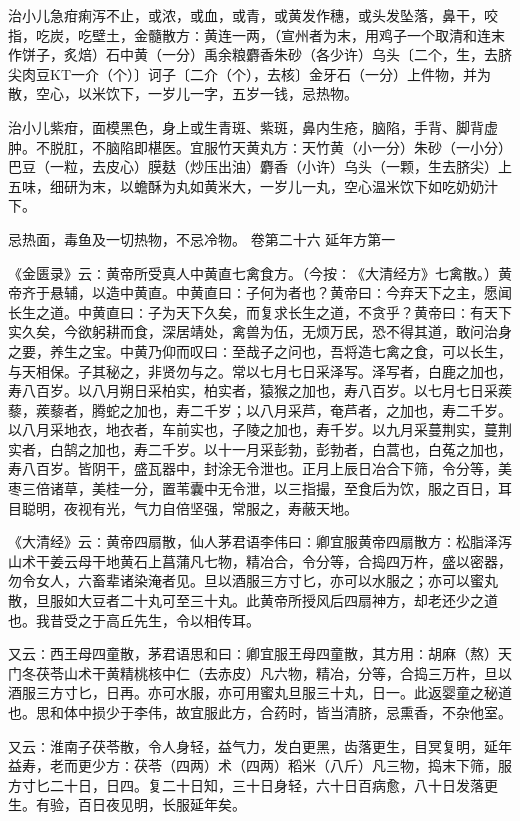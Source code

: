 \documentclass[a4paper,12pt,UTF8,twoside]{ctexbook}
\begin{document}
治小儿急疳痢泻不止，或浓，或血，或青，或黄发作穗，或头发坠落，鼻干，咬指，吃炭，吃壁土，金髓散方∶黄连一两，（宣州者为末，用鸡子一个取清和连末作饼子，炙焙）石中黄（一分）禹余粮麝香朱砂（各少许）乌头〔二个，生，去脐尖肉豆KT一介（个）〕诃子〔二介（个），去核〕金牙石（一分）上件物，并为散，空心，以米饮下，一岁儿一字，五岁一钱，忌热物。

治小儿紫疳，面模黑色，身上或生青斑、紫斑，鼻内生疮，脑陷，手背、脚背虚肿。不脱肛，不脑陷即椹医。宜服竹天黄丸方∶天竹黄（小一分）朱砂（一小分）巴豆（一粒，去皮心）膜麸（炒压出油）麝香（小许）乌头（一颗，生去脐尖）上五味，细研为末，以蟾酥为丸如黄米大，一岁儿一丸，空心温米饮下如吃奶奶汁下。

忌热面，毒鱼及一切热物，不忌冷物。
卷第二十六
延年方第一

《金匮录》云∶黄帝所受真人中黄直七禽食方。（今按∶《大清经方》七禽散。）黄帝齐于悬辅，以造中黄直。中黄直曰∶子何为者也？黄帝曰∶今弃天下之主，愿闻长生之道。中黄直曰∶子为天下久矣，而复求长生之道，不贪乎？黄帝曰∶有天下实久矣，今欲躬耕而食，深居靖处，禽兽为伍，无烦万民，恐不得其道，敢问治身之要，养生之宝。中黄乃仰而叹曰∶至哉子之问也，吾将造七禽之食，可以长生，与天相保。子其秘之，非贤勿与之。常以七月七日采泽写。泽写者，白鹿之加也，寿八百岁。以八月朔日采柏实，柏实者，猿猴之加也，寿八百岁。以七月七日采蒺藜，蒺藜者，腾蛇之加也，寿二千岁；以八月采芦，奄芦者，之加也，寿二千岁。以八月采地衣，地衣者，车前实也，子陵之加也，寿千岁。以九月采蔓荆实，蔓荆实者，白鹄之加也，寿二千岁。以十一月采彭勃，彭勃者，白蒿也，白菟之加也，寿八百岁。皆阴干，盛瓦器中，封涂无令泄也。正月上辰日冶合下筛，令分等，美枣三倍诸草，美桂一分，置苇囊中无令泄，以三指撮，至食后为饮，服之百日，耳目聪明，夜视有光，气力自倍坚强，常服之，寿蔽天地。

《大清经》云∶黄帝四扇散，仙人茅君语李伟曰∶卿宜服黄帝四扇散方∶松脂泽泻山术干姜云母干地黄石上菖蒲凡七物，精冶合，令分等，合捣四万杵，盛以密器，勿令女人，六畜辈诸染淹者见。旦以酒服三方寸匕，亦可以水服之；亦可以蜜丸散，旦服如大豆者二十丸可至三十丸。此黄帝所授风后四扇神方，却老还少之道也。我昔受之于高丘先生，令以相传耳。

又云∶西王母四童散，茅君语思和曰∶卿宜服王母四童散，其方用∶胡麻（熬）天门冬茯苓山术干黄精桃核中仁（去赤皮）凡六物，精冶，分等，合捣三万杵，旦以酒服三方寸匕，日再。亦可水服，亦可用蜜丸旦服三十丸，日一。此返婴童之秘道也。思和体中损少于李伟，故宜服此方，合药时，皆当清脐，忌熏香，不杂他室。

又云∶淮南子茯苓散，令人身轻，益气力，发白更黑，齿落更生，目冥复明，延年益寿，老而更少方∶茯苓（四两）术（四两）稻米（八斤）凡三物，捣末下筛，服方寸匕二十日，日四。复二十日知，三十日身轻，六十日百病愈，八十日发落更生。有验，百日夜见明，长服延年矣。
\end{document}
